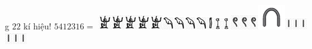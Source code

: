 g $22$ kí hiệu!
	\vskip 0.1cm
	$5412316    =$ \includegraphics{7}\includegraphics{7}\includegraphics{7}\includegraphics{7}\includegraphics{7}\includegraphics{8}\includegraphics{8}\includegraphics{8}\includegraphics{8}\includegraphics{9}\includegraphics{10}\includegraphics{10}\includegraphics{11}\includegraphics{11}\includegraphics{11}\includegraphics{5}\includegraphics{12}\includegraphics{12}\includegraphics{12}\includegraphics{12}\includegraphics{12}\includegraphics{12} 
